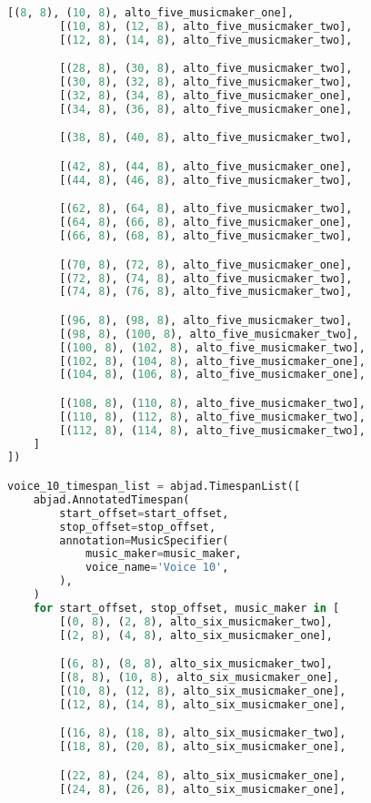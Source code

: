 \begin{lstlisting}[language=Python, caption=Invocation Source Code]
        [(8, 8), (10, 8), alto_five_musicmaker_one],
        [(10, 8), (12, 8), alto_five_musicmaker_two],
        [(12, 8), (14, 8), alto_five_musicmaker_two],

        [(28, 8), (30, 8), alto_five_musicmaker_two],
        [(30, 8), (32, 8), alto_five_musicmaker_two],
        [(32, 8), (34, 8), alto_five_musicmaker_one],
        [(34, 8), (36, 8), alto_five_musicmaker_one],

        [(38, 8), (40, 8), alto_five_musicmaker_two],

        [(42, 8), (44, 8), alto_five_musicmaker_one],
        [(44, 8), (46, 8), alto_five_musicmaker_two],

        [(62, 8), (64, 8), alto_five_musicmaker_two],
        [(64, 8), (66, 8), alto_five_musicmaker_one],
        [(66, 8), (68, 8), alto_five_musicmaker_two],

        [(70, 8), (72, 8), alto_five_musicmaker_one],
        [(72, 8), (74, 8), alto_five_musicmaker_two],
        [(74, 8), (76, 8), alto_five_musicmaker_two],

        [(96, 8), (98, 8), alto_five_musicmaker_two],
        [(98, 8), (100, 8), alto_five_musicmaker_two],
        [(100, 8), (102, 8), alto_five_musicmaker_two],
        [(102, 8), (104, 8), alto_five_musicmaker_one],
        [(104, 8), (106, 8), alto_five_musicmaker_one],

        [(108, 8), (110, 8), alto_five_musicmaker_two],
        [(110, 8), (112, 8), alto_five_musicmaker_two],
        [(112, 8), (114, 8), alto_five_musicmaker_two],
    ]
])

voice_10_timespan_list = abjad.TimespanList([
    abjad.AnnotatedTimespan(
        start_offset=start_offset,
        stop_offset=stop_offset,
        annotation=MusicSpecifier(
            music_maker=music_maker,
            voice_name='Voice 10',
        ),
    )
    for start_offset, stop_offset, music_maker in [
        [(0, 8), (2, 8), alto_six_musicmaker_two],
        [(2, 8), (4, 8), alto_six_musicmaker_one],

        [(6, 8), (8, 8), alto_six_musicmaker_two],
        [(8, 8), (10, 8), alto_six_musicmaker_one],
        [(10, 8), (12, 8), alto_six_musicmaker_one],
        [(12, 8), (14, 8), alto_six_musicmaker_one],

        [(16, 8), (18, 8), alto_six_musicmaker_two],
        [(18, 8), (20, 8), alto_six_musicmaker_one],

        [(22, 8), (24, 8), alto_six_musicmaker_one],
        [(24, 8), (26, 8), alto_six_musicmaker_one],


\end{lstlisting}
